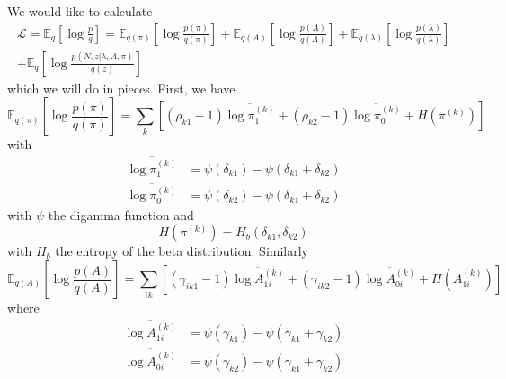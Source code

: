 \documentclass[11pt]{article}
\begin{document}
We would like to calculate 
\begin{multline}
    \mathcal{L} = \mathbb{E}_q\left[\log \frac{p}{q}\right] = \mathbb{E}_{q(\pi)} \left[\log \frac{p(\pi)}{q(\pi)} \right] + \mathbb{E}_{q(A)} \left[\log \frac{p(A)}{q(A)} \right] + \mathbb{E}_{q(\lambda)} \left[\log \frac{p(\lambda)}{q(\lambda)} \right] \\ + \mathbb{E}_{q}\left[ \log \frac{p(N, z|\lambda, A, \pi)}{q(z)}\right] 
\end{multline}
which we will do in pieces. First, we have
\begin{equation}
    \mathbb{E}_{q(\pi)} \left[\log \frac{p(\pi)}{q(\pi)} \right] = \sum_k \left[(\rho_{k1} - 1)\overline{\log \pi_1^{(k)}} + (\rho_{k2} - 1) \overline{\log \pi_0^{(k)}} + H(\pi^{(k)}) \right]
\end{equation}
with
\begin{align}
    \overline{\log \pi_1^{(k)}} &= \psi(\delta_{k1}) - \psi(\delta_{k1} + \delta_{k2}) \\
    \overline{\log \pi_0^{(k)}} &= \psi(\delta_{k2}) - \psi(\delta_{k1} + \delta_{k2})
\end{align}
with $\psi$ the digamma function and 
\begin{equation}
    H(\pi^{(k)}) = H_b(\delta_{k1}, \delta_{k2})
\end{equation}
with $H_b$ the entropy of the beta distribution. Similarly
\begin{equation}
    \mathbb{E}_{q(A)} \left[\log \frac{p(A)}{q(A)} \right] = 
\sum_{ik} \left[ (\gamma_{ik1} - 1) \overline{\log A_{1i}^{(k)}} + (\gamma_{ik2} - 1) \overline{\log A_{0i}^{(k)}} + H(A_{1i}^{(k)}) \right]
\end{equation}
where 
\begin{align}
    \overline{\log A_{1i}^{(k)}} &= \psi(\gamma_{k1}) - \psi(\gamma_{k1} + \gamma_{k2}) \\
    \overline{\log A_{0i}^{(k)}} &= \psi(\gamma_{k2}) - \psi(\gamma_{k1} + \gamma_{k2})
\end{align}
\end{document}
